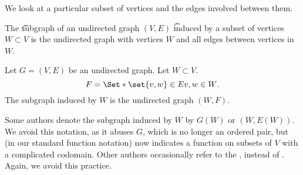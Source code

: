 

We look at a particular subset of vertices and the edges involved between them.


The \t{subgraph} of an undirected graph $(V, E)$ \t{induced by} a subset of vertices $W \subset V$ is the undirected graph with vertices $W$ and all edges between vertices in $W$.


Let $G = (V, E)$ be an undirected graph.
Let $W \subset V$.
\[
  F = \Set*{\set{v, w} \in E}{v, w \in W}.
\]
The subgraph induced by $W$ is the undirected graph $(W, F)$.

Some authors denote the subgraph induced by $W$ by $G(W)$ or $(W, E(W))$.
We avoid this notation, as it abuses $G$, which is no longer an ordered pair, but (in our standard function notation) now indicates a function on subsets of $V$ with a complicated codomain.
Other authors occasionally refer to the , instead of .
Again, we avoid this practice.

\blankpage
